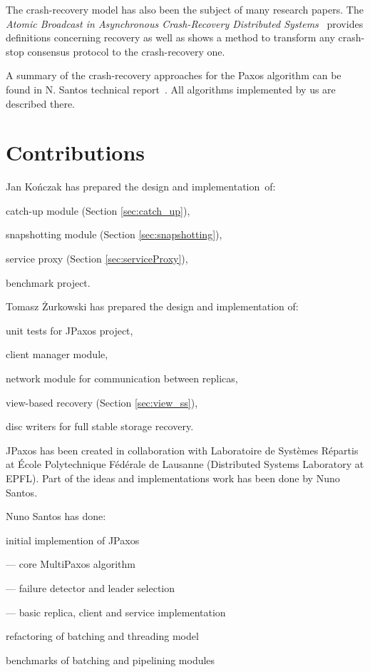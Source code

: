 The crash-recovery model has also been the subject of many research papers. \linebreak The \textit{Atomic Broadcast in Asynchronous Crash-Recovery Distributed Systems}~\cite{rodriguez2000atomic} provides definitions concerning recovery as well as shows a method to transform any crash-stop consensus protocol to the crash-recovery one.

A summary of the crash-recovery approaches for the Paxos algorithm can be found in N. Santos technical report~\cite{Nun10}. All algorithms implemented by us are described there.

\section{Contributions}

Jan Kończak has prepared the design and implementation~of:
\begin{tightList}
  \item[\textbullet] catch-up module (Section \ref{sec:catch_up}),
  \item[\textbullet] snapshotting module (Section \ref{sec:snapshotting}),
  \item[\textbullet] service proxy  (Section \ref{sec:serviceProxy}),
  \item[\textbullet] benchmark project.
\end{tightList}

\noindent Tomasz Żurkowski has prepared the design and implementation of:
\begin{tightList}
  \item[\textbullet] unit tests for JPaxos project,
  \item[\textbullet] client manager module, 
  \item[\textbullet] network module for communication between replicas,
  \item[\textbullet] view-based recovery (Section \ref{sec:view_ss}),
  \item[\textbullet] disc writers for full stable storage recovery.
\end{tightList}

\noindent JPaxos has been created in collaboration with Laboratoire de Systèmes Répartis at École Polytechnique Fédérale de Lausanne (Distributed Systems Laboratory at EPFL). Part of the ideas and implementations work has been done by Nuno Santos.

\noindent Nuno Santos has done:
\begin{tightList}
  \item[\textbullet] initial implemention of JPaxos
  \begin{tightList}
    \item[---] core MultiPaxos algorithm
    \item[---] failure detector and leader selection
    \item[---] basic replica, client and service implementation
  \end{tightList}
  \item[\textbullet] refactoring of batching and threading model
  \item[\textbullet] benchmarks of batching and pipelining modules
\end{tightList}

